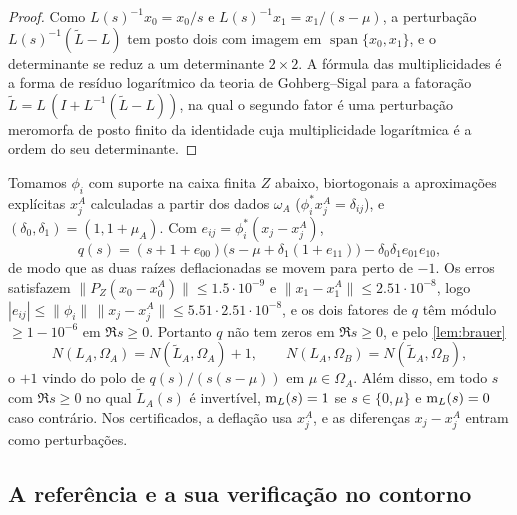 \begin{proof}
Como $L(s)^{-1}x_0=x_0/s$ e $L(s)^{-1}x_1=x_1/(s-\mu)$, a perturbação $L(s)^{-1}(\widetilde L-L)$ tem
posto dois com imagem em $\operatorname{span}\{x_0,x_1\}$, e o determinante se reduz a um determinante
$2\times2$. A fórmula das multiplicidades é a forma de resíduo logarítmico da teoria de Gohberg--Sigal para a
fatoração $\widetilde L=L\,(I+L^{-1}(\widetilde L-L))$, na qual o segundo fator é uma perturbação meromorfa de
posto finito da identidade cuja multiplicidade logarítmica é a ordem do seu determinante.
\end{proof}

Tomamos $\phi_i$ com suporte na caixa finita $Z$ abaixo, biortogonais a aproximações explícitas $x_j^A$ calculadas
a partir dos dados $\omega_A$ ($\phi_i^*x_j^A=\delta_{ij}$), e $(\delta_0,\delta_1)=(1,1+\mu_A)$. Com
$e_{ij}=\phi_i^*(x_j-x_j^A)$,
\[
  q(s)=(s+1+e_{00})\big(s-\mu+\delta_1(1+e_{11})\big)-\delta_0\delta_1e_{01}e_{10},
\]
de modo que as duas raízes deflacionadas se movem para perto de $-1$. Os erros satisfazem $\|P_Z(x_0-x_0^A)\|\le1.5\cdot10^{-9}$
e $\|x_1-x_1^A\|\le2.51\cdot10^{-8}$, logo $|e_{ij}|\le\|\phi_i\|\,\|x_j-x_j^A\|\le5.51\cdot2.51\cdot10^{-8}$, e os dois fatores de $q$ têm módulo
$\ge1-10^{-6}$ em $\Re s\ge0$. Portanto $q$ não tem zeros em $\Re s\ge0$, e pelo \cref{lem:brauer}
\begin{equation}\label{eq:brauer-count}
  N(L_A,\Omega_A)=N(\widetilde L_A,\Omega_A)+1,\qquad N(L_A,\Omega_B)=N(\widetilde L_A,\Omega_B),
\end{equation}
o $+1$ vindo do polo de $q(s)/(s(s-\mu))$ em $\mu\in\Omega_A$. Além disso, em todo $s$ com $\Re s\ge0$ no qual
$\widetilde L_A(s)$ é invertível, $\operatorname{m}_L(s)=1$ se $s\in\{0,\mu\}$ e $\operatorname{m}_L(s)=0$ caso contrário. Nos certificados, a
deflação usa $x_j^A$, e as diferenças $x_j-x_j^A$ entram como perturbações.

\subsection{A referência e a sua verificação no contorno}\label{sec:counting-reference}

